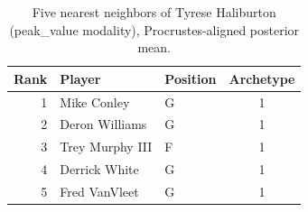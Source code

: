 \begin{table}[htbp]
  \centering\small
  \begin{tabular}{rllc}
    \toprule
    Rank & Player & Position & Archetype \\
    \midrule
    1 & Mike Conley & G & 1 \\
    2 & Deron Williams & G & 1 \\
    3 & Trey Murphy III & F & 1 \\
    4 & Derrick White & G & 1 \\
    5 & Fred VanVleet & G & 1 \\
    \bottomrule
  \end{tabular}
  \caption{Five nearest neighbors of Tyrese Haliburton (peak_value modality), Procrustes-aligned posterior mean.}
  \label{tab:Tyrese_Haliburton_neighbors_peak_value}
\end{table}

